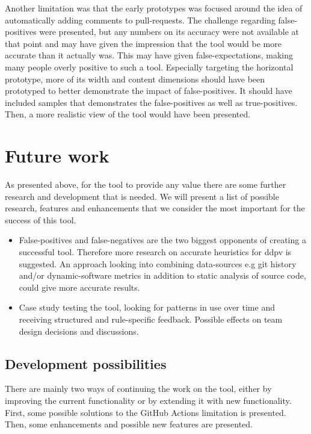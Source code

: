 \documentclass[pdftex,10pt,b5paper,twoside]{report}
\begin{document}
Another limitation was that the early prototypes was focused around the idea of automatically adding comments to pull-requests. The challenge regarding false-positives were presented, but any numbers on its accuracy were not available at that point and may have given the impression that the tool would be more accurate than it actually was. This may have given false-expectations, making many people overly positive to such a tool. Especially targeting the horizontal prototype, more of its width and content dimensions should have been prototyped to better demonstrate the impact of false-positives. It should have included samples that demonstrates the false-positives as well as true-positives. Then, a more realistic view of the tool would have been presented.



\section{Future work}
 As presented above, for the tool to provide any value there are some further research and development that is needed. We will present a list of possible research, features and enhancements that we consider the most important for the success of this tool. 

\begin{itemize}
    \item False-positives and false-negatives are the two biggest opponents of creating a successful tool. Therefore more research on accurate heuristics for \gls{ddpv} is suggested. An approach looking into combining data-sources e.g git history and/or dynamic-software metrics in addition to static analysis of source code, could give more accurate results. 
    
    \item Case study testing the tool, looking for patterns in use over time and receiving structured and rule-specific feedback. Possible effects on team design decisions and discussions.   
\end{itemize}


\subsection*{Development possibilities}
There are mainly two ways of continuing the work on the tool, either by improving the current functionality or by extending it with new functionality. First, some possible solutions to the GitHub Actions limitation is presented. Then, some enhancements and possible new features are presented.
\end{document}
